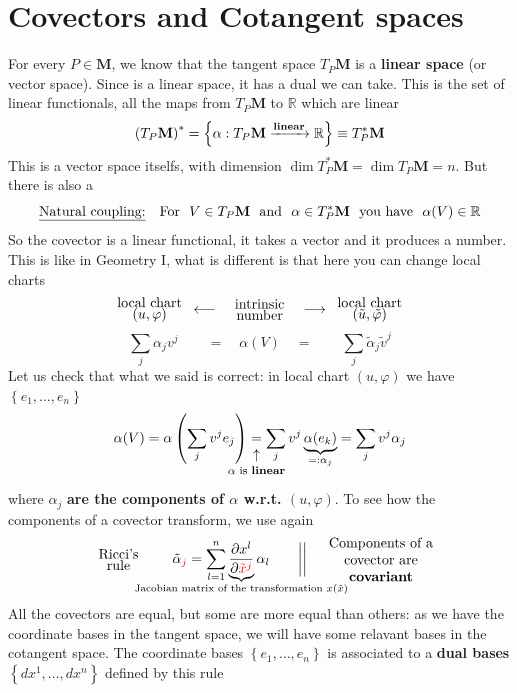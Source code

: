 \documentclass[../main.tex]{subfiles}
\begin{document}
\section{Covectors and Cotangent spaces}
For every $P\in\mathbf{M}$, we know that the tangent space $T_P\mathbf{M}$ is a \textbf{linear space} (or vector space). Since is a linear space, it has a dual we can take. This is the set of linear functionals, all the maps from $T_P\mathbf{M}$ to $\mathbb{R}$ which are linear
\[
\left(T_P\mathbf{M}\right)^\ast=\left\{\alpha:T_P\mathbf{M}\xrightarrow{\textrm{\textbf{linear}}}\mathbb{R}\right\}\equiv T_P^\ast\mathbf{M}
\]
This is a vector space itselfs, with dimension $\dim{T^\ast_P\mathbf{M}}=\dim T_P\mathbf{M}=n$. But there is also a 
\[
\textrm{\underline{Natural coupling:}} \quad \textrm{For } \ V\in T_P\mathbf{M} \ \textrm{ and }\  \alpha\in T_P^\ast\mathbf{M} \ \textrm{ you have }\  \alpha(V)\in\mathbb{R} 
\]
So the covector is a linear functional, it takes a vector and it produces a number. This is like in Geometry I, what is different is that here you can change local charts
\[
\text{\parbox{2 cm}{\centering local chart \\[-4pt]  $(u,\varphi)$}}\longleftarrow\text{\parbox{2 cm}{\centering intrinsic \\[-4pt]  number}}\longrightarrow\text{\parbox{2 cm}{\centering local chart \\[-4pt] $(\tilde{u},\tilde{\varphi})$}}
\]
\[
\sum_j\alpha_jv^j\qquad =\quad \alpha(V)\quad =\qquad \sum_j\tilde{\alpha}_j\tilde{v}^j
\]
Let us check that what we said is correct: in local chart $(u, \varphi)$ we have $\left\{e_1,\dots,e_n\right\}$
\[
\alpha(V)=\alpha\left(\sum_jv^je_j\right) \underset{\mathclap{\tikz \node {$\uparrow$} node [below=1ex] {\footnotesize $\alpha$ is \textbf{linear}};}}{=} \sum_jv^j\underbrace{\alpha(e_k)}_{=:\alpha_j}= \sum_j v^j\alpha_j
\]
where $\alpha_j$ \textbf{are the components of $\alpha$ w.r.t. $(u,\varphi)$}. To see how the components of a covector transform, we use again
\[
\text{\parbox{2 cm}{\centering Ricci's \\[-4pt]  rule}}\quad \tilde{\alpha}_{\textcolor{red}{j}}=\sum_{l=1}^n\underbrace{\frac{\partial x^l}{\partial\textcolor{red}{\tilde{x}^j}}}_{\mathclap{\text{Jacobian matrix of the transformation $x(\tilde{x})$}}}\alpha_l \qquad \bigg|\bigg| \quad \text{\parbox{3 cm}{\centering Components of a covector are \textbf{covariant}}}
\]
All the covectors are equal, but some are more equal than others: as we have the coordinate bases in the tangent space, we will have some relavant bases in the cotangent space. The coordinate bases \(\left\{e_1,\dots,e_n\right\}\) is associated to a \textbf{dual bases} \(\left\{dx^1,\dots,dx^n\right\}\) defined by this rule
\end{document}
